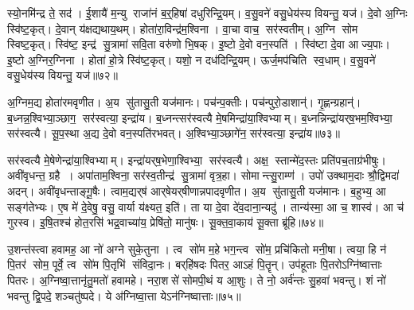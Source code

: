 स्यो॒नमि॑न्द्र ते॒ सद॑।
ई॒शायै॑ म॒न्यु राजा॑नं ब॒र्॒हिषा॑ दधुरिन्द्रि॒यम्।
व॒सु॒वने॑ वसु॒धेय॑स्य वियन्तु॒ यज॑।
दे॒वो अ॒ग्निः स्वि॑ष्ट॒कृत्।
दे॒वान् य॑क्षद्यथाय॒थम्।
होता॑रा॒विन्द्र॑म॒श्विना।
वा॒चा वाच॒ सर॑स्वतीम्।
अ॒ग्नि सोम स्विष्ट॒कृत्।
स्वि॑ष्ट॒ इन्द्र॑ सु॒त्रामा॑ सवि॒ता वरु॑णो भि॒षक्।
इ॒ष्टो दे॒वो वन॒स्पति॑।
स्वि॑ष्टा दे॒वा आज्य॒पाः।
इ॒ष्टो अ॒ग्निर॒ग्निना।
होता॑ हो॒त्रे स्वि॑ष्ट॒कृत्।
यशो॒ न दध॑दिन्द्रि॒यम्।
ऊर्ज॒मप॑चिति स्व॒धाम्।
व॒सु॒वने॑ वसु॒धेय॑स्य वियन्तु॒ यज॑॥७२॥\anuvakamend[द्वारो॑ दधुरिन्द्रि॒यं व॑सु॒वने॑ वसु॒धेय॑स्य वियन्तु॒ यज॒ जोष्ट्रीभ्यान्दधुरिन्द्रि॒यं व॑सु॒वने॑ वसु॒धेय॑स्य वियन्तु॒ यज॒ होतृ॑भ्यान्दधुरिन्द्रि॒यं व॑सु॒वने॑ वसु॒धेय॑स्य वियन्तु॒ यजेन्द्रि॒याणि॑ वसु॒वने॑ वसु॒धेय॑स्य वियन्तु॒ यज॒ सर॑स्वत्या॒ वन॒स्पति॒ष्षट्च॑ (दे॒वं ब॒र्॒हिर्दे॒वीर्द्वारो॑ दे॒वी उ॒षासा॑व॒श्विना॑ दे॒वी जोष्ट्री॑ दे॒वी ऊ॒र्जाहु॑ती दे॒वा दे॒वानां भि॒षजा॑ वषट्का॒रैर्दे॒वीस्ति॒स्रस्ति॒स्रो दे॒वीर्दे॒व इन्द्रो॒ नरा॒शसो॑ दे॒व इन्द्रो॒ वन॒स्पति॑र्दे॒वं ब॒र्॒हिर्वारि॑तीनान्दे॒वो अ॒ग्निः स्वि॑ष्ट॒कृद्दे॒वान्।
स॒मिधा॒ऽग्निन्दे॒वं ब॒र्॒हिः सर॑स्वत्य॒श्विना॒ सर्व॑ वियन्तु।
द्वार॑स्ति॒स्रः सर्व॑वियन्तु।
अ॒ज इन्द्र॒मोजो॒ऽग्निं पर॒ सर॑स्वतीम्।
नक्तं॒ पूर्व॒ सर॑स्वति।
अ॒न्यत्र॒ सर॑स्वती।
भि॒षक्पूर्व॑न्दुह इन्द्रि॒यम्।
अ॒न्यत्र॑ दधुरिन्द्रि॒यम्।
सौ॒त्रा॒म॒ण्या सु॑तासु॒ती।
अ॒ञ्जन्त्य॒यं यज॑मानः ॥ )]

अ॒ग्निम॒द्य होता॑रमवृणीत।
अ॒य सु॑तासु॒ती यज॑मानः।
पच॑न्प॒क्तीः।
पच॑न्पुरो॒डाशान्॑।
गृ॒ह्णन्ग्रहान्॑।
ब॒ध्नन्न॒श्विभ्या॒ञ्छाग॒ सर॑स्वत्या॒ इन्द्रा॑य।
ब॒ध्नन्त्सर॑स्वत्यै मे॒षमिन्द्रा॑या॒श्विभ्याम्।
ब॒ध्नन्निन्द्रा॑यर्‌ष॒भम॒श्विभ्या॒ सर॑स्वत्यै।
सू॒प॒स्था अ॒द्य दे॒वो वन॒स्पति॑रभवत्।
अ॒श्विभ्या॒ञ्छागे॑न॒ सर॑स्वत्या॒ इन्द्रा॑य॥७३॥

सर॑स्वत्यै मे॒षेणेन्द्रा॑या॒श्विभ्याम्।
इन्द्रा॑यर्‌ष॒भेणा॒श्विभ्या॒ सर॑स्वत्यै।
अक्ष॒ स्तान्मे॑द॒स्तः प्रति॑पच॒ताग्र॑भीषुः।
अवी॑वृधन्त॒ ग्रहै।
अपा॑ताम॒श्विना॒ सर॑स्व॒तीन्द्र॑ सु॒त्रामा॑ वृत्र॒हा।
सोमान्त्सु॒राम्ण॑।
उपो॑ उक्थाम॒दाः श्रौ॒द्विमदा॑ अदन्।
अवी॑वृधन्ताङ्गू॒षैः।
त्वाम॒द्यर्‌ष॑ आर्‌षेयर्‌षीणान्नपादवृणीत।
अ॒य सु॑तासु॒ती यज॑मानः।
ब॒हुभ्य॒ आ सङ्ग॑तेभ्यः।
ए॒ष मे॑ दे॒वेषु॒ वसु॒ वार्या य॑क्ष्यत॒ इति॑।
ता या दे॒वा दे॑व॒दाना॒न्यदु॑।
तान्य॑स्मा॒ आ च॒ शास्व॑।
आ च॑ गुरस्व।
इ॒षि॒तश्च॑ होत॒रसि॑ भद्र॒वाच्या॑य॒ प्रेषि॑तो॒ मानु॑षः।
सू॒क्त॒वा॒काय॑ सू॒क्ता ब्रू॑हि॥७४॥\anuvakamend[इन्द्रा॑य॒ यज॑मानः स॒प्त च॑]

उ॒शन्त॑स्त्वा हवामह॒ आ नो॑ अग्ने सुके॒तुना।
त्व सो॑म म॒हे भग॒न्त्व सो॑म॒ प्रचि॑कितो मनी॒षा।
त्वया॒ हि न॑ पि॒तर॑ सोम॒ पूर्वे॒ त्व सो॑म पि॒तृभि॑ संविदा॒नः।
बर्‌हि॑षदः पितर॒ आऽहं पि॒तॄन्।
उप॑हूताः पि॒तरोऽग्नि॑ष्वात्ताः पितरः।
अ॒ग्निष्वा॒त्तानृ॑तु॒मतो॑ हवामहे।
नरा॒शसे॑ सोमपी॒थं य आ॒शुः।
ते नो॒ अर्व॑न्तः सु॒हवा॑ भवन्तु।
शं नो॑ भवन्तु द्वि॒पदे॒ शञ्चतु॑ष्पदे।
ये अ॑ग्निष्वा॒त्ता येऽन॑ग्निष्वात्ताः॥७५॥

